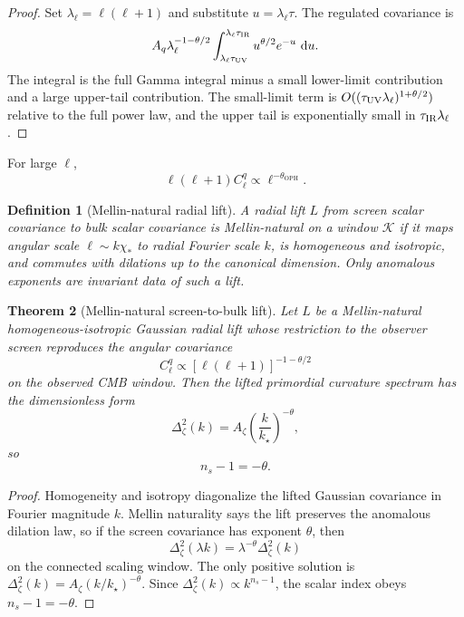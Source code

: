 \documentclass[11pt]{article}
\newtheorem{theorem}{Theorem}[section]
\newtheorem{definition}[theorem]{Definition}
\newcommand{\OPH}{\mathrm{OPH}}
\newcommand{\dd}{\,\mathrm d}
\begin{document}
\begin{proof}
Set \(\lambda_\ell=\ell(\ell+1)\) and substitute \(u=\lambda_\ell\tau\). The regulated covariance is
\[
A_q\lambda_\ell^{-1-\theta/2}
\int_{\lambda_\ell\tau_{\rm UV}}^{\lambda_\ell\tau_{\rm IR}}
u^{\theta/2}e^{-u}\,\dd u .
\]
The integral is the full Gamma integral minus a small lower-limit contribution and a large
upper-tail contribution. The small-limit term is
\(O((\tau_{\rm UV}\lambda_\ell)^{1+\theta/2})\) relative to the full power law, and the upper tail is
exponentially small in \(\tau_{\rm IR}\lambda_\ell\).
\end{proof}

For large \(\ell\),
\[
\ell(\ell+1)C_\ell^q\propto \ell^{-\theta_{\OPH}}.
\]

\begin{definition}[Mellin-natural radial lift]\label{def:mellin-lift}
A radial lift \(L\) from screen scalar covariance to bulk scalar covariance is Mellin-natural on a
window \(\mathcal K\) if it maps angular scale \(\ell\sim k\chi_\ast\) to radial Fourier scale \(k\),
is homogeneous and isotropic, and commutes with dilations up to the canonical dimension. Only
anomalous exponents are invariant data of such a lift.
\end{definition}

\begin{theorem}[Mellin-natural screen-to-bulk lift]\label{thm:screen-bulk-lift}
Let \(L\) be a Mellin-natural homogeneous-isotropic Gaussian radial lift whose restriction to the
observer screen reproduces the angular covariance
\[
C_\ell^q\propto[\ell(\ell+1)]^{-1-\theta/2}
\]
on the observed CMB window. Then the lifted primordial curvature spectrum has the dimensionless form
\[
\Delta_\zeta^2(k)
=
A_\zeta
\left(\frac{k}{k_\star}\right)^{-\theta},
\]
so
\[
n_s-1=-\theta .
\]
\end{theorem}

\begin{proof}
Homogeneity and isotropy diagonalize the lifted Gaussian covariance in Fourier magnitude \(k\).
Mellin naturality says the lift preserves the anomalous dilation law, so if the screen covariance
has exponent \(\theta\), then
\[
\Delta_\zeta^2(\lambda k)=\lambda^{-\theta}\Delta_\zeta^2(k)
\]
on the connected scaling window. The only positive solution is
\(\Delta_\zeta^2(k)=A_\zeta(k/k_\star)^{-\theta}\). Since
\(\Delta_\zeta^2(k)\propto k^{n_s-1}\), the scalar index obeys \(n_s-1=-\theta\).
\end{proof}
\end{document}
